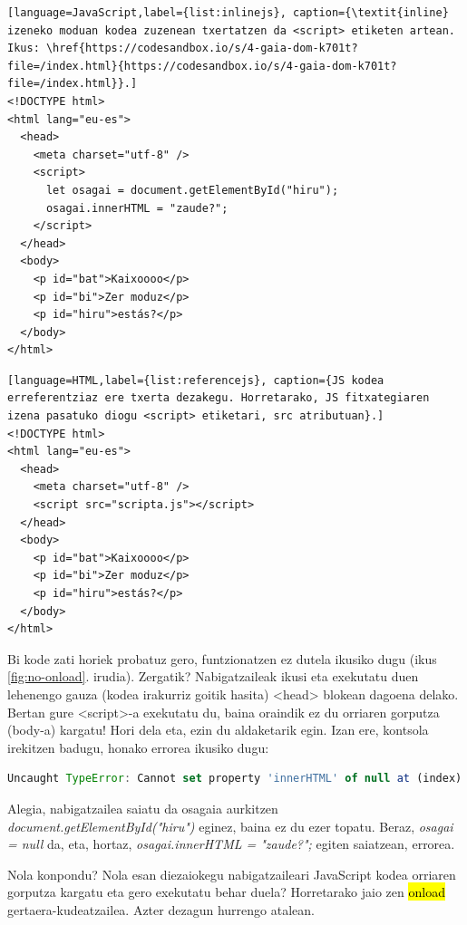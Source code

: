 \begin{lstlisting}[language=JavaScript,label={list:inlinejs}, caption={\textit{inline} izeneko moduan kodea zuzenean txertatzen da <script> etiketen artean. Ikus: \href{https://codesandbox.io/s/4-gaia-dom-k701t?file=/index.html}{https://codesandbox.io/s/4-gaia-dom-k701t?file=/index.html}}.]
<!DOCTYPE html>
<html lang="eu-es">
  <head>
    <meta charset="utf-8" />
    <script>
      let osagai = document.getElementById("hiru");
      osagai.innerHTML = "zaude?";
    </script>
  </head>
  <body>
    <p id="bat">Kaixoooo</p>
    <p id="bi">Zer moduz</p>
    <p id="hiru">estás?</p>
  </body>
</html>
\end{lstlisting}

\begin{lstlisting}[language=HTML,label={list:referencejs}, caption={JS kodea erreferentziaz ere txerta dezakegu. Horretarako, JS fitxategiaren izena pasatuko diogu <script> etiketari, src atributuan}.]
<!DOCTYPE html>
<html lang="eu-es">
  <head>
    <meta charset="utf-8" />
    <script src="scripta.js"></script>
  </head>
  <body>
    <p id="bat">Kaixoooo</p>
    <p id="bi">Zer moduz</p>
    <p id="hiru">estás?</p>
  </body>
</html>
\end{lstlisting}

Bi kode zati horiek probatuz gero, funtzionatzen ez dutela ikusiko dugu (ikus \ref{fig:no-onload}. irudia). Zergatik? Nabigatzaileak ikusi eta exekutatu duen lehenengo gauza (kodea irakurriz goitik hasita) <head> blokean dagoena delako. Bertan gure <script>-a exekutatu du, baina oraindik ez du orriaren gorputza (body-a) kargatu! Hori dela eta, ezin du aldaketarik egin. Izan ere, kontsola irekitzen badugu, honako errorea ikusiko dugu:

\begin{lstlisting}[language=JavaScript,numbers=none]
Uncaught TypeError: Cannot set property 'innerHTML' of null at (index):9
\end{lstlisting}
    
Alegia, nabigatzailea saiatu da osagaia aurkitzen \textit{document.getElementById("hiru")} eginez, baina ez du ezer topatu. Beraz, \textit{osagai = null} da, eta, hortaz, 
\textit{osagai.innerHTML = "zaude?";} egiten saiatzean, errorea.

Nola konpondu? Nola esan diezaiokegu nabigatzaileari JavaScript kodea orriaren gorputza kargatu eta gero exekutatu behar duela? Horretarako jaio zen \hl{onload} gertaera-kudeatzailea. Azter dezagun hurrengo atalean.

